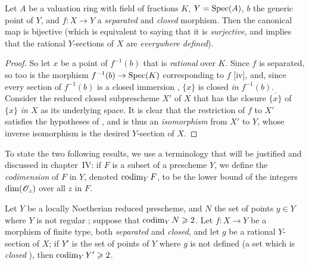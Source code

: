 \begin{proposition}[7.3.3]
\label{II.7.3.3}
Let $A$ be a valuation ring with field of fractions $K$, $Y=\operatorname{Spec}(A)$, $b$ the generic point of $Y$, and $f:X\to Y$ a \emph{separated} and \emph{closed} morphism.
Then the canonical map  is bijective (which is equivalent to saying that it is \emph{surjective}, and implies that the rational $Y$-sections of $X$ are \emph{everywhere defined}).
\end{proposition}

\begin{proof}
So let $x$ be a point of $f^{-1}(b)$ that is \emph{rational} over $K$.
Since $f$ is separated, so too is the morphism $f^{-1}(b)\to\Spec(K)$ corresponding to $f$ [iv], and, since every section of $f^{-1}(b)$ is a closed immersion , $\{x\}$ is closed \emph{in $f^{-1}(b)$}.
Consider the reduced closed subprescheme $X'$ of $X$ that has the closure $\overline{\{x\}}$ of $\{x\}$ \emph{in $X$} as its underlying space.
It is clear that the restriction of $f$ to $X'$ satisfies the hypotheses of , and is thus an \emph{isomorphism} from $X'$ to $Y$, whose inverse isomorphism is the desired $Y$-section of $X$.
\end{proof}

\begin{env}[7.3.4]
\label{II.7.3.4}
To state the two following results, we use a terminology that will be justified and discussed in chapter~IV: if $F$ is a subset
of a prescheme $Y$, we define the \emph{codimension} of $F$ in $Y$, denoted $\operatorname{codim}_Y F$, to be the lower bound of the integers $\dim(\mathscr{O}_z)$ over all $z$ in $F$.
\end{env}

\begin{corollary}[7.3.5]
\label{II.7.3.5}
Let $Y$ be a locally Noetherian reduced prescheme, and $N$ the set of points $y\in Y$ where $Y$ is not regular ;
suppose that $\operatorname{codim}_Y N\geqslant2$.
Let $f:X\to Y$ be a morphism of finite type, both \emph{separated} and \emph{closed}, and let $g$ be a rational $Y$-section of $X$;
if $Y'$ is the set of points of $Y$ where $g$ is not defined (a set which is \emph{closed} ), then $\operatorname{codim}_Y Y'\geqslant2$.
\end{corollary}

